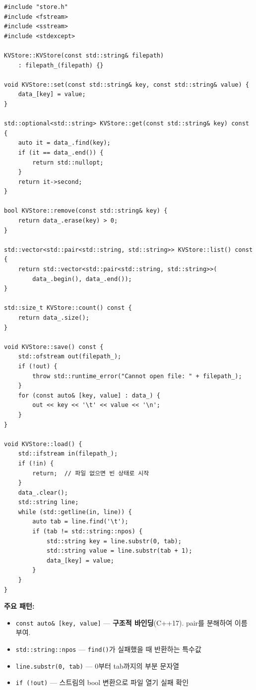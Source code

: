 \documentclass[11pt,a4paper]{book}
\newcommand{\file}[1]{\texttt{#1}}
\newcommand{\code}[1]{\texttt{#1}}
\begin{document}
\begin{lstlisting}[style=cpp,title={\file{src/store.cpp} (업데이트)}]
#include "store.h"
#include <fstream>
#include <sstream>
#include <stdexcept>

KVStore::KVStore(const std::string& filepath)
    : filepath_(filepath) {}

void KVStore::set(const std::string& key, const std::string& value) {
    data_[key] = value;
}

std::optional<std::string> KVStore::get(const std::string& key) const {
    auto it = data_.find(key);
    if (it == data_.end()) {
        return std::nullopt;
    }
    return it->second;
}

bool KVStore::remove(const std::string& key) {
    return data_.erase(key) > 0;
}

std::vector<std::pair<std::string, std::string>> KVStore::list() const {
    return std::vector<std::pair<std::string, std::string>>(
        data_.begin(), data_.end());
}

std::size_t KVStore::count() const {
    return data_.size();
}

void KVStore::save() const {
    std::ofstream out(filepath_);
    if (!out) {
        throw std::runtime_error("Cannot open file: " + filepath_);
    }
    for (const auto& [key, value] : data_) {
        out << key << '\t' << value << '\n';
    }
}

void KVStore::load() {
    std::ifstream in(filepath_);
    if (!in) {
        return;  // 파일 없으면 빈 상태로 시작
    }
    data_.clear();
    std::string line;
    while (std::getline(in, line)) {
        auto tab = line.find('\t');
        if (tab != std::string::npos) {
            std::string key = line.substr(0, tab);
            std::string value = line.substr(tab + 1);
            data_[key] = value;
        }
    }
}
\end{lstlisting}

\textbf{주요 패턴:}
\begin{itemize}[nosep]
\item \code{const auto\& [key, value]} — \textbf{구조적 바인딩}(C++17). pair를 분해하여 이름 부여.
\item \code{std::string::npos} — \code{find()}가 실패했을 때 반환하는 특수값
\item \code{line.substr(0, tab)} — 0부터 tab까지의 부분 문자열
\item \code{if (!out)} — 스트림의 bool 변환으로 파일 열기 실패 확인
\end{itemize}
\end{document}

